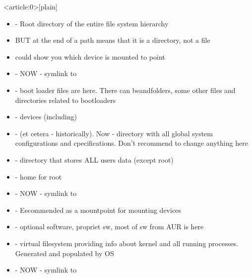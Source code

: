 \documentclass[usenames,dvipsnames,10pt,aspectratio=169]{beamer}
\begin{document}
{ %
    \begin{frame}<article:0>[plain]
     \end{frame}
}

\begin{frame}
    \begin{itemize}
        \item \ex{/} - Root directory of the entire file system hierarchy
        \item BUT \ex{/} at the end of a path means that it is a directory, not a file
        \item {} could show you which device is mounted to  point
        \item {}- NOW - symlink to
        \item {}- boot loader files are here. There can beandfolders, some other files and directories related to bootloaders
        \item {}- devices (including)
        \item {}- (et cetera - historically). Now - directory with all global system configurations and cpecifications. Don't recommend to change anything here
        \item {}- directory that stores ALL users data (except root)
        \item {}- home for root
        \item {}- NOW - symlink to 
        \item {}- Eecommended as a mountpoint for mounting devices
        \item {}- optional software, propriet sw, most of sw from AUR is here
        \item {}- virtual filesystem providing info about kernel and all running processes. Generated and populated by OS
        \item {}- NOW - symlink to 
    \end{itemize}
\end{frame}
\end{document}
